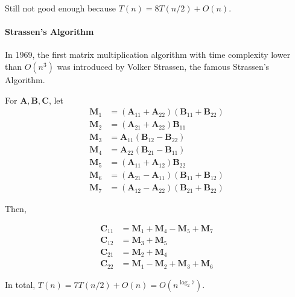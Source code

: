                    Still not good enough because $T(n) = 8T(n/2) + O(n)$. 

                \paragraph{Strassen's Algorithm}

                    In 1969, the first matrix multiplication algorithm with time complexity lower than $O(n^3)$ was introduced by Volker Strassen, the famous Strassen's Algorithm. 

                    For $\mathbf{A}, \mathbf{B}, \mathbf{C}$, let
                    \begin{align*}
                        \mathbf{M}_1 &= (\mathbf{A}_{11} + \mathbf{A}_{22}) (\mathbf{B}_{11} + \mathbf{B}_{22})\\
                        \mathbf{M}_2 &= (\mathbf{A}_{21} + \mathbf{A}_{22}) \mathbf{B}_{11}\\
                        \mathbf{M}_3 &= \mathbf{A}_{11} (\mathbf{B}_{12} - \mathbf{B}_{22})\\
                        \mathbf{M}_4 &= \mathbf{A}_{22} (\mathbf{B}_{21} - \mathbf{B}_{11})\\
                        \mathbf{M}_5 &= (\mathbf{A}_{11} + \mathbf{A}_{12}) \mathbf{B}_{22}\\
                        \mathbf{M}_6 &= (\mathbf{A}_{21} - \mathbf{A}_{11}) (\mathbf{B}_{11} + \mathbf{B}_{12}) \\
                        \mathbf{M}_7 &= (\mathbf{A}_{12} - \mathbf{A}_{22}) (\mathbf{B}_{21} + \mathbf{B}_{22})
                    \end{align*}

                    Then, 

                    \begin{align*}
                        \mathbf{C}_{11} &= \mathbf{M}_1 + \mathbf{M}_4 - \mathbf{M}_5 + \mathbf{M}_7\\
                        \mathbf{C}_{12} &= \mathbf{M}_3 + \mathbf{M}_5\\
                        \mathbf{C}_{21} &= \mathbf{M}_2 + \mathbf{M}_4\\
                        \mathbf{C}_{22} &= \mathbf{M}_1 - \mathbf{M}_2 + \mathbf{M}_3 + \mathbf{M}_6
                    \end{align*}

                    In total, $T(n) = 7T(n/2) + O(n) = O(n^{\log_2 7})$.

